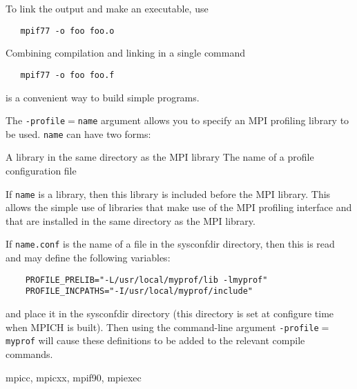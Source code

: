 \par
To link the output and make an executable, use
\begin{verbatim}
   mpif77 -o foo foo.o
\end{verbatim}

Combining compilation and linking in a single command
\begin{verbatim}
   mpif77 -o foo foo.f
\end{verbatim}

is a convenient way to build simple programs.
\par
{}
The {\tt -profile$=$name} argument allows you to specify an MPI profiling
library to be used.  {\tt name} can have two forms:
\par
\nextline
A library in the same directory as the MPI library
\nextline
The name of a profile configuration file
\nextline
\par
If {\tt name} is a library, then this library is included before the MPI
library.  This allows the simple use of libraries that make use of the
MPI profiling interface and that are installed in the same directory as
the MPI library.
\par
If {\tt name.conf} is the name of a file in the sysconfdir directory, then this
is read and may define the following variables:
\par
\begin{verbatim}
    PROFILE_PRELIB="-L/usr/local/myprof/lib -lmyprof"
    PROFILE_INCPATHS="-I/usr/local/myprof/include"
\end{verbatim}

and place it in the sysconfdir directory (this directory is set at
configure time when MPICH is built).  Then using the command-line
argument {\tt -profile$=$myprof} will cause these
definitions to be added to the relevant compile commands.
\par
{}
 mpicc, mpicxx, mpif90, mpiexec
\nextline
{}
\endmanpage
